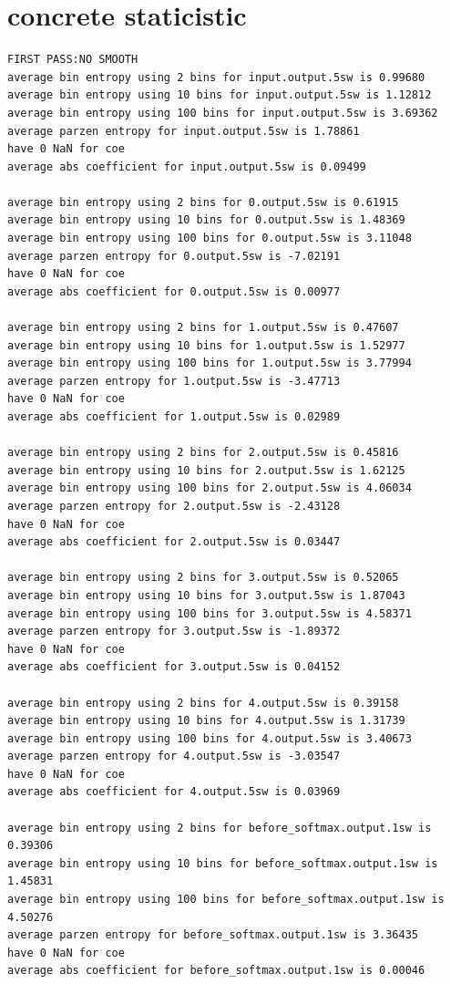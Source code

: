 \documentclass[11pt]{article}
\begin{document}
\section{concrete staticistic}
\begin{verbatim}
FIRST PASS:NO SMOOTH
average bin entropy using 2 bins for input.output.5sw is 0.99680
average bin entropy using 10 bins for input.output.5sw is 1.12812
average bin entropy using 100 bins for input.output.5sw is 3.69362
average parzen entropy for input.output.5sw is 1.78861
have 0 NaN for coe
average abs coefficient for input.output.5sw is 0.09499

average bin entropy using 2 bins for 0.output.5sw is 0.61915
average bin entropy using 10 bins for 0.output.5sw is 1.48369
average bin entropy using 100 bins for 0.output.5sw is 3.11048
average parzen entropy for 0.output.5sw is -7.02191
have 0 NaN for coe
average abs coefficient for 0.output.5sw is 0.00977

average bin entropy using 2 bins for 1.output.5sw is 0.47607
average bin entropy using 10 bins for 1.output.5sw is 1.52977
average bin entropy using 100 bins for 1.output.5sw is 3.77994
average parzen entropy for 1.output.5sw is -3.47713
have 0 NaN for coe
average abs coefficient for 1.output.5sw is 0.02989

average bin entropy using 2 bins for 2.output.5sw is 0.45816
average bin entropy using 10 bins for 2.output.5sw is 1.62125
average bin entropy using 100 bins for 2.output.5sw is 4.06034
average parzen entropy for 2.output.5sw is -2.43128
have 0 NaN for coe
average abs coefficient for 2.output.5sw is 0.03447

average bin entropy using 2 bins for 3.output.5sw is 0.52065
average bin entropy using 10 bins for 3.output.5sw is 1.87043
average bin entropy using 100 bins for 3.output.5sw is 4.58371
average parzen entropy for 3.output.5sw is -1.89372
have 0 NaN for coe
average abs coefficient for 3.output.5sw is 0.04152

average bin entropy using 2 bins for 4.output.5sw is 0.39158
average bin entropy using 10 bins for 4.output.5sw is 1.31739
average bin entropy using 100 bins for 4.output.5sw is 3.40673
average parzen entropy for 4.output.5sw is -3.03547
have 0 NaN for coe
average abs coefficient for 4.output.5sw is 0.03969

average bin entropy using 2 bins for before_softmax.output.1sw is 0.39306
average bin entropy using 10 bins for before_softmax.output.1sw is 1.45831
average bin entropy using 100 bins for before_softmax.output.1sw is 4.50276
average parzen entropy for before_softmax.output.1sw is 3.36435
have 0 NaN for coe
average abs coefficient for before_softmax.output.1sw is 0.00046




\end{verbatim}
\end{document}
